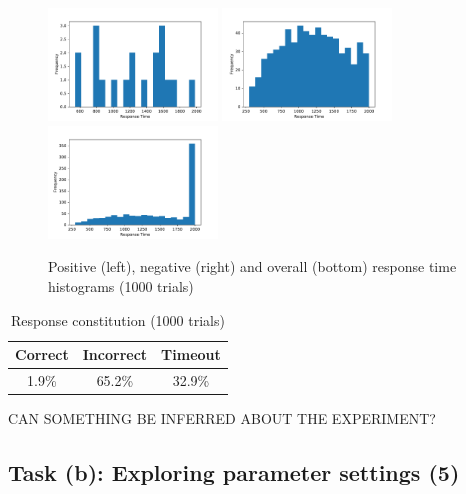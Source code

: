 \documentclass{article}
\begin{document}
\begin{figure}[H]
  \centering
  \includegraphics[width=0.4\textwidth]{figures/part1/task1/positive_response_time_histogram.pdf}
  \includegraphics[width=0.4\textwidth]{figures/part1/task1/negative_response_time_histogram.pdf}
  \includegraphics[width=0.4\textwidth]{figures/part1/task1/overall_response_time_histogram.pdf}
  \caption{Positive (left), negative (right) and overall (bottom) response time histograms (1000 trials)}
  \label{fig:responsetimehistograms}
\end{figure}

\begin{table}[h]
  \begin{tabular}{|l|l|l|}
  \hline
  \textbf{Correct}            & \textbf{Incorrect}          & \textbf{Timeout}            \\ \hline
  \multicolumn{1}{|c|}{1.9\%} & \multicolumn{1}{c|}{65.2\%} & \multicolumn{1}{c|}{32.9\%} \\ \hline
  \end{tabular}
  \centering
  \caption{Response constitution (1000 trials)}
  \label{table:responseconstitution}
\end{table}

CAN SOMETHING BE INFERRED ABOUT THE EXPERIMENT?

\subsection{Task (b): Exploring parameter settings (5)}
\end{document}
